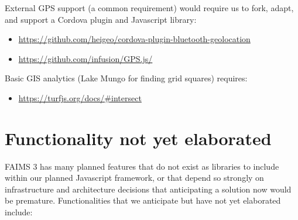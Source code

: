 \documentclass[a4paper,headings=small fontsize=10pt]{scrreprt}
\begin{document}
External GPS support (a common requirement) would require us to fork,
adapt, and support a Cordova plugin and Javascript library:

\begin{itemize}
\item \href{https://github.com/heigeo/cordova-plugin-bluetooth-geolocation}{{https://github.com/heigeo/cordova-plugin-bluetooth-geolocation}}
 
\item \href{https://github.com/infusion/GPS.js/}{{https://github.com/infusion/GPS.js/}}
 
\end{itemize}

Basic GIS analytics (Lake Mungo for finding grid squares) requires:

\begin{itemize}
\item \href{https://turfjs.org/docs/\#intersect}{{https://turfjs.org/docs/\#intersect}}
 
\end{itemize}

\section{Functionality not yet
elaborated}

FAIMS 3 has many planned features that do not exist as libraries to
include within our planned Javascript framework, or that depend so
strongly on infrastructure and architecture decisions that anticipating
a solution now would be premature. Functionalities that we anticipate
but have not yet elaborated include:
\end{document}
